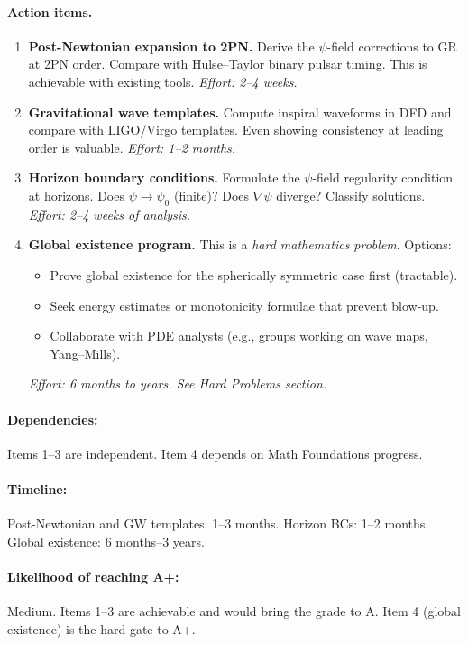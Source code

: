 \documentclass[11pt,a4paper]{article}
\begin{document}
\paragraph{Action items.}
\begin{enumerate}
    \item \textbf{Post-Newtonian expansion to 2PN.} Derive the $\psi$-field corrections to GR at 2PN order. Compare with Hulse--Taylor binary pulsar timing. This is achievable with existing tools. \emph{Effort: 2--4 weeks.}
    \item \textbf{Gravitational wave templates.} Compute inspiral waveforms in DFD and compare with LIGO/Virgo templates. Even showing consistency at leading order is valuable. \emph{Effort: 1--2 months.}
    \item \textbf{Horizon boundary conditions.} Formulate the $\psi$-field regularity condition at horizons. Does $\psi \to \psi_0$ (finite)? Does $\nabla\psi$ diverge? Classify solutions. \emph{Effort: 2--4 weeks of analysis.}
    \item \textbf{Global existence program.} This is a \emph{hard mathematics problem}. Options:
    \begin{itemize}
        \item Prove global existence for the spherically symmetric case first (tractable).
        \item Seek energy estimates or monotonicity formulae that prevent blow-up.
        \item Collaborate with PDE analysts (e.g., groups working on wave maps, Yang--Mills).
    \end{itemize}
    \emph{Effort: 6 months to years. See Hard Problems section.}
\end{enumerate}

\paragraph{Dependencies:} Items 1--3 are independent. Item 4 depends on Math Foundations progress.

\paragraph{Timeline:} Post-Newtonian and GW templates: 1--3 months. Horizon BCs: 1--2 months. Global existence: 6 months--3 years.

\paragraph{Likelihood of reaching A+:} \textcolor{gradeBplus}{Medium}. Items 1--3 are achievable and would bring the grade to A. Item 4 (global existence) is the hard gate to A+.
\end{document}
